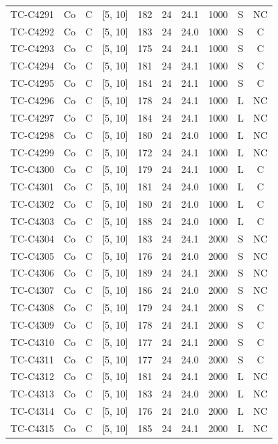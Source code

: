 \begin{longtable}{lccccccccc}
TC-C4291 & Co & C & [5, 10] & 182 & 24 & 24.1 & 1000 & S & NC \\
TC-C4292 & Co & C & [5, 10] & 183 & 24 & 24.0 & 1000 & S & C \\
TC-C4293 & Co & C & [5, 10] & 175 & 24 & 24.1 & 1000 & S & C \\
TC-C4294 & Co & C & [5, 10] & 181 & 24 & 24.1 & 1000 & S & C \\
TC-C4295 & Co & C & [5, 10] & 184 & 24 & 24.1 & 1000 & S & C \\
TC-C4296 & Co & C & [5, 10] & 178 & 24 & 24.1 & 1000 & L & NC \\
TC-C4297 & Co & C & [5, 10] & 184 & 24 & 24.1 & 1000 & L & NC \\
TC-C4298 & Co & C & [5, 10] & 180 & 24 & 24.0 & 1000 & L & NC \\
TC-C4299 & Co & C & [5, 10] & 172 & 24 & 24.1 & 1000 & L & NC \\
TC-C4300 & Co & C & [5, 10] & 179 & 24 & 24.1 & 1000 & L & C \\
TC-C4301 & Co & C & [5, 10] & 181 & 24 & 24.0 & 1000 & L & C \\
TC-C4302 & Co & C & [5, 10] & 180 & 24 & 24.0 & 1000 & L & C \\
TC-C4303 & Co & C & [5, 10] & 188 & 24 & 24.0 & 1000 & L & C \\
TC-C4304 & Co & C & [5, 10] & 183 & 24 & 24.1 & 2000 & S & NC \\
TC-C4305 & Co & C & [5, 10] & 176 & 24 & 24.0 & 2000 & S & NC \\
TC-C4306 & Co & C & [5, 10] & 189 & 24 & 24.1 & 2000 & S & NC \\
TC-C4307 & Co & C & [5, 10] & 186 & 24 & 24.0 & 2000 & S & NC \\
TC-C4308 & Co & C & [5, 10] & 179 & 24 & 24.1 & 2000 & S & C \\
TC-C4309 & Co & C & [5, 10] & 178 & 24 & 24.1 & 2000 & S & C \\
TC-C4310 & Co & C & [5, 10] & 177 & 24 & 24.1 & 2000 & S & C \\
TC-C4311 & Co & C & [5, 10] & 177 & 24 & 24.0 & 2000 & S & C \\
TC-C4312 & Co & C & [5, 10] & 181 & 24 & 24.1 & 2000 & L & NC \\
TC-C4313 & Co & C & [5, 10] & 183 & 24 & 24.0 & 2000 & L & NC \\
TC-C4314 & Co & C & [5, 10] & 176 & 24 & 24.0 & 2000 & L & NC \\
TC-C4315 & Co & C & [5, 10] & 185 & 24 & 24.1 & 2000 & L & NC \\

\end{longtable}

